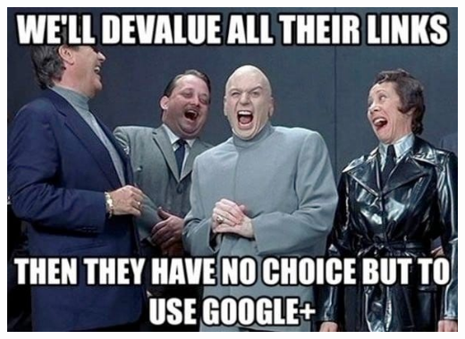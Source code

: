 \documentclass[
10pt, %
aspectratio=169, %
]{beamer}
\begin{document}
	{
		{%
			\includegraphics[width=\paperwidth,height=\paperheight]{meme2.jpg}
		}
		
		\begin{frame}
		\end{frame}
	}
	
\end{document}
